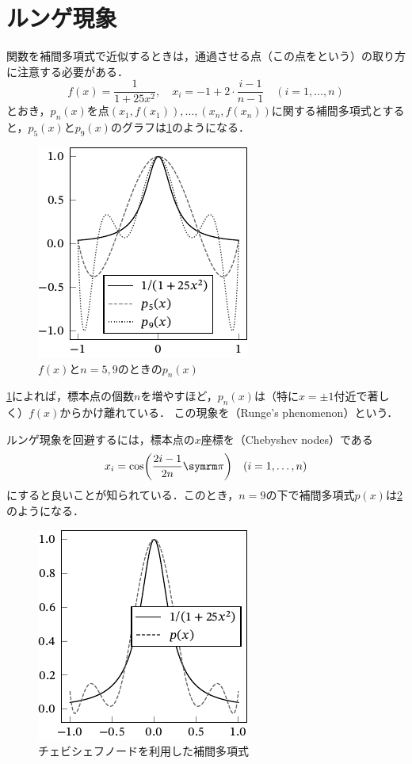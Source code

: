 \documentclass[../../main]{subfiles}
\begin{document}
\section{ルンゲ現象}
関数を補間多項式で近似するときは，通過させる点（この点をという）の取り方に注意する必要がある．
\[
  f(x) = \frac{1}{1+25x^2},
  \quad x_i = -1+2\cdot\frac{i-1}{n-1}\quad(i=1,\dots,n)
\]
とおき，\(p_n(x)\)を点\((x_1,f(x_1)),\dots,(x_n,f(x_n))\)に関する補間多項式とすると，\(p_5(x)\)と\(p_9(x)\)のグラフは\cref{figure:runge}のようになる．

\begin{figure}[htbp]
  \centering
  \includegraphics{runge.pdf}
  \caption{\(f(x)\)と\(n=5,9\)のときの\(p_n(x)\)}
  \label{figure:runge}
\end{figure}

\cref{figure:runge}によれば，標本点の個数\(n\)を増やすほど，\(p_n(x)\)は（特に\(x=\pm 1\)付近で著しく）\(f(x)\)からかけ離れている．
この現象を（Runge's phenomenon）という．

ルンゲ現象を回避するには，標本点の\(x\)座標を（Chebyshev nodes）である
\[
  x_i = \cos\pqty*{\frac{2i-1}{2n}\krez}\quad (i=1,\dots,n)
\]
にすると良いことが知られている\cite{horinouchi2015}．このとき，\(n=9\)の下で補間多項式\(p(x)\)は\cref{figure:chebyshev}のようになる．

\begin{figure}[htbp]
  \centering
  \includegraphics{chebyshev.pdf}
  \caption{チェビシェフノードを利用した補間多項式}
  \label{figure:chebyshev}
\end{figure}
\end{document}

